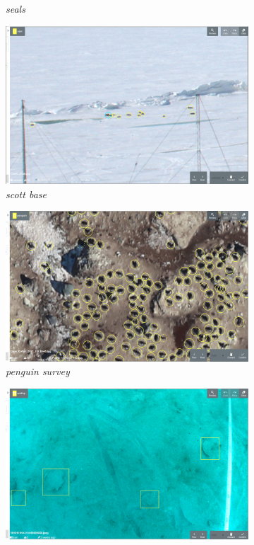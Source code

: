 \begin{figure}[htbp]
\begin{subfigure}[t]{0.24\linewidth}
  \caption{\emph{seals}}
\end{subfigure}%
\begin{subfigure}[t]{0.24\linewidth}
  \includegraphics[width=1.0\linewidth]{figures/annotation/screenshots/scott_base_sunny.png}
  \caption{\emph{scott base}}
\end{subfigure}
\begin{subfigure}[t]{0.24\linewidth}
  \includegraphics[width=1.0\linewidth]{figures/annotation/screenshots/penguins_aerial2.png}
  \caption{\emph{penguin survey}}
\end{subfigure}%
\begin{subfigure}[t]{0.24\linewidth}
  \includegraphics[width=1.0\linewidth]{figures/annotation/screenshots/scallops4.png}

\end{subfigure}
\end{figure}
